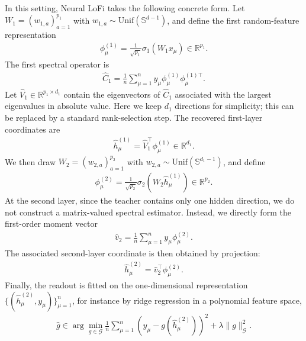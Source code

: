 In this setting, Neural LoFi takes the following concrete form. Let $W_1=(w_{1,a})_{a=1}^{p_1}$ with $w_{1,a}\sim \mathrm{Unif}(\mathbb S^{d-1})$, and define the first random-feature representation
\begin{align}
    \phi^{(1)}_\mu
    =
    \frac{1}{\sqrt{p_1}}
    \sigma_1(W_1 x_\mu)
    \in \mathbb R^{p_1}.
\end{align}
The first spectral operator is
\begin{align}
    \widehat C_1
    =
    \frac1n
    \sum_{\mu=1}^n
    y_\mu
    \phi^{(1)}_\mu
    \phi^{(1)\top}_\mu .
\end{align}
Let $\widehat V_1\in\mathbb R^{p_1\times d_1}$ contain the eigenvectors of $\widehat C_1$ associated with the largest eigenvalues in absolute value. Here we keep $d_1$ directions for simplicity; this can be replaced by a standard rank-selection step. The recovered first-layer coordinates are
\begin{align}
    \widehat h^{(1)}_\mu
    =
    \widehat V_1^\top \phi^{(1)}_\mu
    \in \mathbb R^{d_1}.
\end{align}
We then draw $W_2=(w_{2,a})_{a=1}^{p_2}$ with $w_{2,a}\sim \mathrm{Unif}(\mathbb S^{d_1-1})$, and define
\begin{align}
    \phi^{(2)}_\mu
    =
    \frac{1}{\sqrt{p_2}}
    \sigma_2(W_2 \widehat h^{(1)}_\mu)
    \in \mathbb R^{p_2}.
\end{align}
At the second layer, since the teacher contains only one hidden direction, we do not construct a matrix-valued spectral estimator. Instead, we directly form the first-order moment vector
\begin{align}
    \widehat v_2
    =
    \frac1n
    \sum_{\mu=1}^n
    y_\mu
    \phi^{(2)}_\mu .
\end{align}
The associated second-layer coordinate is then obtained by projection:
\begin{align}
    \widehat h^{(2)}_\mu
    =
    \widehat v_2^\top \phi^{(2)}_\mu .
\end{align}
Finally, the readout is fitted on the one-dimensional representation $\{(\widehat h^{(2)}_\mu,y_\mu)\}_{\mu=1}^n$, for instance by ridge regression in a polynomial feature space,
\begin{align}
    \widehat g
    \in
    \arg\min_{g\in\mathcal G}
    \frac1n
    \sum_{\mu=1}^n
    \left(
        y_\mu - g(\widehat h^{(2)}_\mu)
    \right)^2
    +
    \lambda \|g\|_{\mathcal G}^2 .
\end{align}

